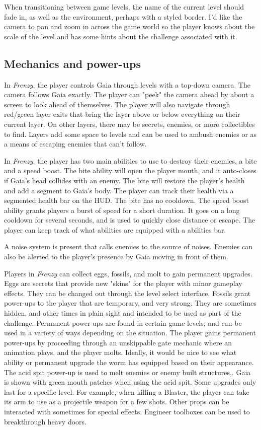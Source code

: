 \documentclass[12pt]{report}
\begin{document}
When transitioning between game levels, the name of the current level should fade in, as 
well as the environment, perhaps with a styled border. I'd like the camera to pan and zoom 
in across the game world so the player knows about the scale of the level and has some hints
about the challenge associated with it.

\pagebreak
\subsection*{Mechanics and power-ups}
In \emph{Frenzy}, the player controls Gaia through levels with a top-down camera. The camera
follows Gaia exactly. The player can "peek" the camera ahead by about a screen to look ahead
of themselves. The player will also navigate through red/green layer exits that bring the 
layer above or below everything on their current layer. On other layers, there may be
secrets, enemies, or more collectibles to find. Layers add some space to levels and can
be used to ambush enemies or as a means of escaping enemies that can't follow.

In \emph{Frenzy}, the player has two main abilities to use to destroy their enemies, a bite 
and a speed boost. The bite ability will open the player mouth, and it auto-closes if Gaia's
head collides with an enemy. The bite will restore the player's health and add a segment
to Gaia's body. The player can track their health via a segmented health bar on the HUD. 
The bite has no cooldown. The speed boost ability grants players a burst of speed for a 
short duration. It goes on a long cooldown for several seconds, and is used to quickly 
close distance or escape. The player can keep track of what abilities are equipped with a 
abilities bar.

A noise system is present that calls enemies to the source of noises. Enemies can also be
alerted to the player's presence by Gaia moving in front of them.

Players in \emph{Frenzy} can collect eggs, fossils, and molt to gain permanent upgrades. Eggs 
are secrets that provide new "skins" for the player with minor gameplay effects. They can 
be changed out through the level select interface. Fossils grant power-ups to the player 
that are temporary, and very strong. They are sometimes hidden, and other times in plain 
sight and intended to be used as part of the challenge. Permanent power-ups are found in 
certain game levels, and can be used in a variety of ways depending on the situation. The 
player gains permanent power-ups by proceeding through an unskippable gate mechanic where an
animation plays, and the player molts. Ideally, it would be nice to see what ability or 
permanent upgrade the worm has equipped based on their appearance. The
acid spit power-up is used to melt enemies or enemy built structures,. Gaia is shown with 
green mouth patches when using the acid spit. Some upgrades only last for a specific level. 
For example, when killing a Blaster, the player can take its arm to use as a projectile 
weapon for a few shots. Other props can be interacted with sometimes for special effects. 
Engineer toolboxes can be used to breakthrough heavy doors.
\end{document}

